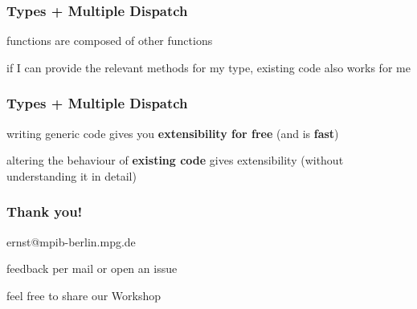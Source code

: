 \documentclass[notes]{beamer}
\newenvironment{wideitemize}{
    \itemize\addtolength{\itemsep}{15pt}\addtolength{\topsep}{10pt}}{\enditemize}
\begin{document}
    \begin{frame}
    \frametitle{Types + Multiple Dispatch}
    \vspace{1cm}
        \begin{wideitemize}
            \item functions are composed of other functions
            \item if I can provide the relevant methods for my type, existing code also works for me
        \end{wideitemize}
        \vspace{1cm}
    \end{frame}

    \begin{frame}
    \frametitle{Types + Multiple Dispatch}
    \vspace{1cm}
        \begin{wideitemize}
            \item writing generic code gives you \textbf{extensibility for free} (and is \textbf{fast})
            \item altering the behaviour of \textbf{existing code} gives extensibility (without understanding it in detail)
        \end{wideitemize}
    \end{frame}



    \begin{frame}
    \frametitle{Thank you!}
    \vspace{1cm}
        \begin{wideitemize}
            \item ernst@mpib-berlin.mpg.de
            \item feedback per mail or open an issue
            \item feel free to share our Workshop
        \end{wideitemize}
    \end{frame}
\end{document}
